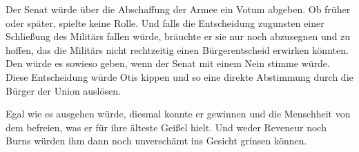\par

Der Senat würde über die Abschaffung der Armee ein Votum abgeben.
Ob früher oder später, spielte keine Rolle.
Und falls die Entscheidung zugunsten einer Schließung des Militärs fallen würde, bräuchte er sie nur noch abzusegnen und zu hoffen, das die Militärs nicht rechtzeitig einen Bürgerentscheid erwirken könnten.
Den würde es sowieso geben, wenn der Senat mit einem Nein stimme würde.
Diese Entscheidung würde Otis kippen und so eine direkte Abstimmung durch die Bürger der Union auslösen.

\par

Egal wie es ausgehen würde, diesmal konnte er gewinnen und die Menschheit von dem befreien, was er für ihre älteste Geißel hielt.
Und weder Reveneur noch Burns würden ihm dann noch unverschämt ins Gesicht grinsen können.